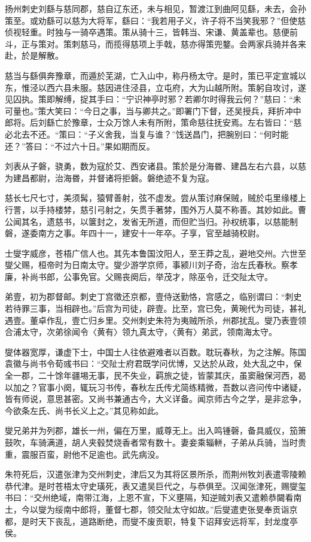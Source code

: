 \documentclass[12pt,UTF8]{ctexbook}
\begin{document}
扬州刺史刘繇与慈同郡，慈自辽东还，未与相见，暂渡江到曲阿见繇，未去，会孙策至。或劝繇可以慈为大将军，繇曰：“我若用子义，许子将不当笑我邪？”但使慈侦视轻重。时独与一骑卒遇策。策从骑十三，皆韩当、宋谦、黄盖辈也。慈便前斗，正与策对。策刺慈马，而揽得慈项上手戟，慈亦得策兜鍪。会两家兵骑并各来赴，於是解散。

慈当与繇俱奔豫章，而遁於芜湖，亡入山中，称丹杨太守。是时，策已平定宣城以东，惟泾以西六县未服。慈因进住泾县，立屯府，大为山越所附。策躬自攻讨，遂见囚执。策即解缚，捉其手曰：“宁识神亭时邪？若卿尔时得我云何？”慈曰：“未可量也。”策大笑曰：“今日之事，当与卿共之。”即署门下督，还吴授兵，拜折冲中郎将。后刘繇亡於豫章，士众万馀人未有所附，策命慈往抚安焉。左右皆曰：“慈必北去不还。“策曰：“子义舍我，当复与谁？”饯送昌门，把腕别曰：“何时能还？”答曰：“不过六十日。”果如期而反。

刘表从子磐，骁勇，数为寇於艾、西安诸县。策於是分海昬、建昌左右六县，以慈为建昌都尉，治海昬，并督诸将拒磐。磐绝迹不复为寇。

慈长七尺七寸，美须髯，猿臂善射，弦不虚发。尝从策讨麻保贼，贼於屯里缘楼上行詈，以手持楼棼，慈引弓射之，矢贯手著棼，围外万人莫不称善。其妙如此。曹公闻其名，遗慈书，以箧封之，发省无所道，而但贮当归。孙权统事，以慈能制磐，遂委南方之事。年四十一，建安十一年卒。子享，官至越骑校尉。

士燮字威彦，苍梧广信人也。其先本鲁国汶阳人，至王莽之乱，避地交州。六世至燮父赐，桓帝时为日南太守。燮少游学京师，事颍川刘子奇，治左氏春秋。察孝廉，补尚书郎，公事免官。父赐丧阕后，举茂才，除巫令，迁交阯太守。

弟壹，初为郡督邮。刺史丁宫徵还京都，壹侍送勤恪，宫感之，临别谓曰：“刺史若待罪三事，当相辟也。”后宫为司徒，辟壹。比至，宫已免，黄琬代为司徒，甚礼遇壹。董卓作乱，壹亡归乡里。交州刺史朱符为夷贼所杀，州郡扰乱。燮乃表壹领合浦太守，次弟徐闻令〈黄有〉领九真太守，〈黄有〉弟武，领南海太守。

燮体器宽厚，谦虚下士，中国士人往依避难者以百数。耽玩春秋，为之注解。陈国袁徽与尚书令荀彧书曰：“交阯士府君既学问优博，又达於从政，处大乱之中，保全一郡，二十馀年疆埸无事，民不失业，羁旅之徒，皆蒙其庆，虽窦融保河西，曷以加之？官事小阕，辄玩习书传，春秋左氏传尤简练精微，吾数以咨问传中诸疑，皆有师说，意思甚密。又尚书兼通古今，大义详备。闻京师古今之学，是非忿争，今欲条左氏、尚书长义上之。”其见称如此。

燮兄弟并为列郡，雄长一州，偏在万里，威尊无上。出入鸣锺磬，备具威仪，笳箫鼓吹，车骑满道，胡人夹毂焚烧香者常有数十。妻妾乘辎軿，子弟从兵骑，当时贵重，震服百蛮，尉他不足逾也。武先病没。

朱符死后，汉遣张津为交州刺史，津后又为其将区景所杀，而荆州牧刘表遣零陵赖恭代津。是时苍梧太守史璜死，表又遣吴巨代之，与恭俱至。汉闻张津死，赐燮玺书曰：“交州绝域，南带江海，上恩不宣，下义壅隔，知逆贼刘表又遣赖恭闚看南土，今以燮为绥南中郎将，董督七郡，领交阯太守如故。”后燮遣吏张旻奉贡诣京都，是时天下丧乱，道路断绝，而燮不废贡职，特复下诏拜安远将军，封龙度亭侯。
\end{document}
